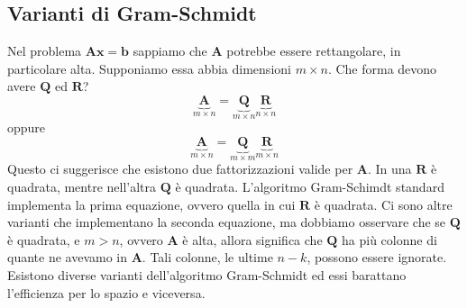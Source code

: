 \documentclass{article}
\begin{document}
            \subsection{Varianti di Gram-Schmidt}
                Nel problema $\mathbf{Ax} = \mathbf{b}$ sappiamo che $\mathbf{A}$ potrebbe essere rettangolare, in particolare alta. 
                Supponiamo essa abbia dimensioni $m \times n$. Che forma devono avere $\mathbf{Q}$ ed $\mathbf{R}$?
                \[\underbrace{\mathbf{A}}_{m \times n} = \underbrace{\mathbf{Q}}_{m \times n} \underbrace{\mathbf{R}}_{n \times n}\]
                oppure
                \[\underbrace{\mathbf{A}}_{m \times n} = \underbrace{\mathbf{Q}}_{m \times m} \underbrace{\mathbf{R}}_{m \times n}\]
                Questo ci suggerisce che esistono due fattorizzazioni valide per $\mathbf{A}$. In una $\mathbf{R}$ è quadrata, 
                mentre nell'altra $\mathbf{Q}$ è quadrata. L'algoritmo Gram-Schimdt standard implementa la prima equazione, ovvero 
                quella in cui $\mathbf{R}$ è quadrata. Ci sono altre varianti che implementano la seconda equazione, ma dobbiamo osservare che 
                se $\mathbf{Q}$ è quadrata, e $m > n$, ovvero $\mathbf{A}$ è alta, allora significa che $\mathbf{Q}$ ha più colonne 
                di quante ne avevamo in $\mathbf{A}$. Tali colonne, le ultime $n-k$, possono essere ignorate. 
                Esistono diverse varianti dell'algoritmo Gram-Schmidt ed essi barattano l'efficienza per lo spazio e viceversa.
\end{document}
